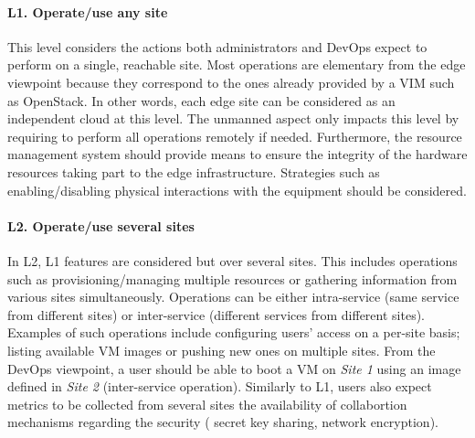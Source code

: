 \paragraph{L1. Operate/use any site}
This level
considers the actions both administrators and DevOps expect to perform on a
single, reachable site.
%
Most operations are elementary from the edge viewpoint because they correspond
to the ones already provided by a VIM such as OpenStack.
In other words, each edge site can be considered as an independent cloud at
this level. The unmanned aspect only impacts this level by requiring to perform
all operations remotely if needed.
Furthermore, the resource management system should provide means to
ensure the integrity of the hardware resources taking part to the edge
infrastructure. Strategies such as enabling/disabling physical
interactions with the equipment should be considered.




\paragraph{L2. Operate/use several sites}

In L2, L1 features are considered but over several sites. This
includes operations such as provisioning/managing multiple resources or
gathering information from various sites simultaneously.
Operations can be either intra-service (same service from different sites) or
inter-service (different services from different sites). Examples of 
such operations include configuring users'
access on a per-site basis; listing available VM images or pushing new
ones on multiple sites. From the
DevOps viewpoint, a user should be able to boot a VM on \emph{Site 1}
using an image defined in \emph{Site 2}
(inter-service operation). Similarly to L1, users also expect metrics to be collected
from several sites the availability of collabortion mechanisms regarding the security (\eg
secret key sharing, network encryption).

